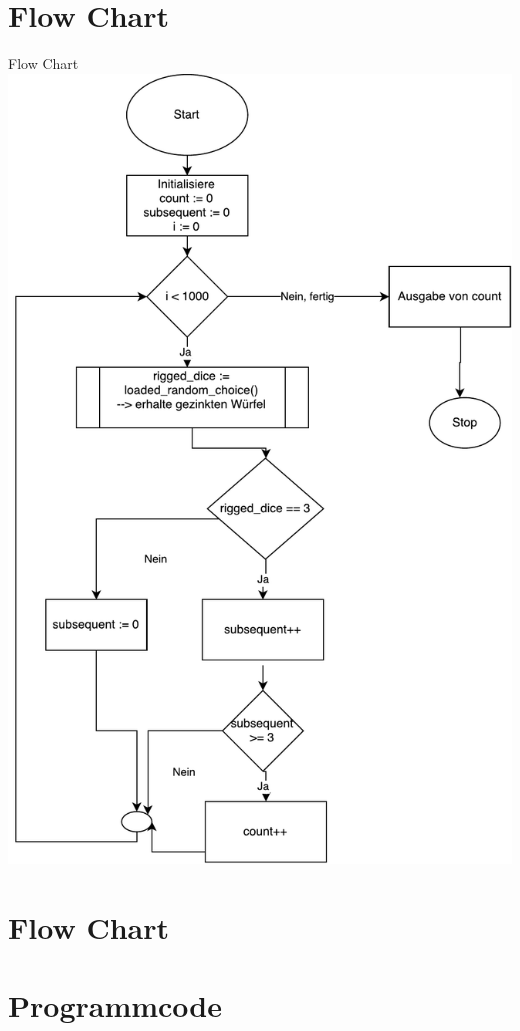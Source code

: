 \section{Flow Chart}
\begin{frame}{Flow Chart}
	\centering
  	\includegraphics[scale=0.27]{BSP06_Flow_Chart_1.pdf}
\end{frame}
\section{Flow Chart}

\section{Programmcode}
